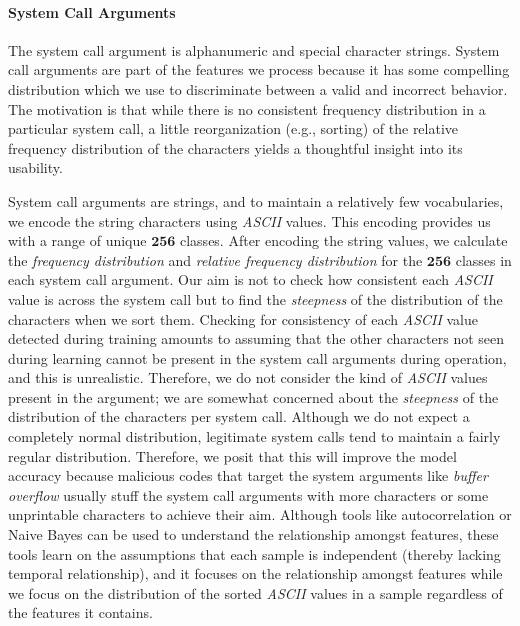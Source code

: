 \paragraph{System Call Arguments}
The system call argument is alphanumeric and special character strings. System 
call arguments are part of the features we process because it has some 
compelling distribution which we use to discriminate between a valid and 
incorrect behavior. The motivation is that while there is no consistent 
frequency distribution in a particular system call, a little reorganization 
(e.g., sorting) of the relative frequency distribution of the characters yields 
a thoughtful insight into its usability. \par
System call arguments are strings, and to maintain a relatively few 
vocabularies, we encode the string characters using \textit{ASCII} values. This 
encoding provides us with a range of unique $\mathbf{256} $ classes. After 
encoding the string values, we calculate the \emph{frequency distribution} and 
\emph{relative frequency distribution} for the $ \bm{256} $ classes in each 
system call argument. 
Our aim is not to check how consistent each \textit{ASCII} value is across the 
system call but to find the \emph{steepness} of the distribution of the 
characters when we sort them. Checking for consistency of each \textit{ASCII} 
value detected during training amounts to assuming that the other characters 
not seen during learning cannot be present in the system call arguments during 
operation, and this is unrealistic. Therefore, we do not consider the kind of 
\textit{ASCII} values present in the argument; we are somewhat concerned about 
the \emph{steepness} of the distribution of the characters per system call. 
Although we do not expect a completely normal distribution, 
legitimate system calls tend to maintain a fairly regular distribution. 
Therefore, we posit that this will improve the model accuracy because 
malicious codes that target the system arguments like \emph{buffer overflow} 
usually stuff the system call arguments with more characters or some 
unprintable characters to achieve their aim. Although tools like 
autocorrelation or Naive Bayes can be used to understand the relationship 
amongst features, these tools learn on the assumptions that each sample is 
independent (thereby lacking temporal relationship), and it focuses on the 
relationship amongst features while we focus on the distribution of the sorted 
\textit{ASCII} values in a sample regardless of the features it contains. \par

